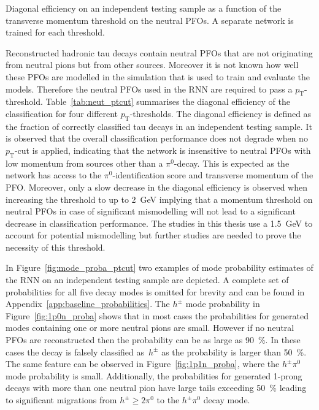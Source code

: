 \begin{table}[htb]
  \centering
  
  \caption{Diagonal efficiency on an independent testing sample as a function of
    the transverse momentum threshold on the neutral PFOs. A separate network is
    trained for each threshold.}
  \label{tab:neut_ptcut}
\end{table}

Reconstructed hadronic tau decays contain neutral PFOs that are not originating
from neutral pions but from other sources. Moreover it is not known how well
these PFOs are modelled in the simulation that is used to train and evaluate the
models. Therefore the neutral PFOs used in the RNN are required to pass a
$p_\text{T}$-threshold. Table~\ref{tab:neut_ptcut} summarises the diagonal
efficiency of the classification for four different $p_\text{T}$-thresholds. The
diagonal efficiency is defined as the fraction of correctly classified tau
decays in an independent testing sample.
It is observed that the overall classification performance does not degrade when
no $p_\text{T}$-cut is applied, indicating that the network is insensitive to
neutral PFOs with low momentum from sources other than a $\pi^0$-decay. This is
expected as the network has access to the $\pi^0$-identification score and
transverse momentum of the PFO. Moreover, only a slow decrease in the diagonal
efficiency is observed when increasing the threshold to up to \SI{2}{\GeV}
implying that a momentum threshold on neutral PFOs in case of significant
mismodelling will not lead to a significant decrease in classification
performance. The studies in this thesis use a \SI{1.5}{\giga\electronvolt} to
account for potential mismodelling but further studies are needed to prove the
necessity of this threshold.

In Figure~\ref{fig:mode_proba_ptcut} two examples of mode probability estimates
of the RNN on an independent testing sample are depicted. A complete set of
probabilities for all five decay modes is omitted for brevity and can be found
in Appendix~\ref{app:baseline_probabilities}. The $h^\pm$ mode probability in
Figure~\ref{fig:1p0n_proba} shows that in most cases the probabilities for
generated modes containing one or more neutral pions are small. However if no
neutral PFOs are reconstructed then the probability can be as large as
\SI{90}{\percent}. In these cases the decay is falsely classified as~$h^\pm$ as
the probability is larger than \SI{50}{\percent}. The same feature can be
observed in Figure~\ref{fig:1p1n_proba}, where the $h^\pm \pi^0$ mode
probability is small. Additionally, the probabilities for generated 1-prong
decays with more than one neutral pion have large tails exceeding
\SI{50}{\percent} leading to significant migrations from $h^\pm \geq 2 \pi^0$ to
the $h^\pm \pi^0$ decay mode. 

